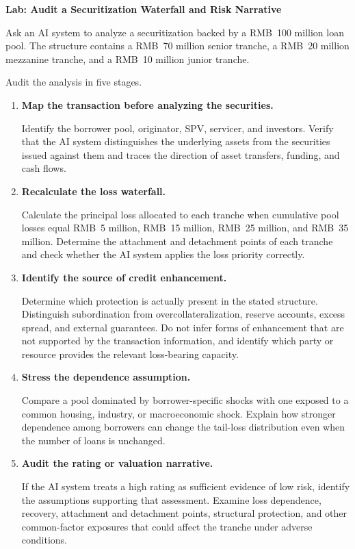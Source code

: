 

\textbf{Lab: Audit a Securitization Waterfall and Risk Narrative}

Ask an AI system to analyze a securitization backed by a RMB~100 million loan pool. The structure contains a RMB~70 million senior tranche, a RMB~20 million mezzanine tranche, and a RMB~10 million junior tranche.

Audit the analysis in five stages.

\begin{enumerate}

\item \textbf{Map the transaction before analyzing the securities.}

Identify the borrower pool, originator, SPV, servicer, and investors. Verify that the AI system distinguishes the underlying assets from the securities issued against them and traces the direction of asset transfers, funding, and cash flows.

\item \textbf{Recalculate the loss waterfall.}

Calculate the principal loss allocated to each tranche when cumulative pool losses equal RMB~5 million, RMB~15 million, RMB~25 million, and RMB~35 million. Determine the attachment and detachment points of each tranche and check whether the AI system applies the loss priority correctly.

\item \textbf{Identify the source of credit enhancement.}

Determine which protection is actually present in the stated structure. Distinguish subordination from overcollateralization, reserve accounts, excess spread, and external guarantees. Do not infer forms of enhancement that are not supported by the transaction information, and identify which party or resource provides the relevant loss-bearing capacity.

\item \textbf{Stress the dependence assumption.}

Compare a pool dominated by borrower-specific shocks with one exposed to a common housing, industry, or macroeconomic shock. Explain how stronger dependence among borrowers can change the tail-loss distribution even when the number of loans is unchanged.

\item \textbf{Audit the rating or valuation narrative.}

If the AI system treats a high rating as sufficient evidence of low risk, identify the assumptions supporting that assessment. Examine loss dependence, recovery, attachment and detachment points, structural protection, and other common-factor exposures that could affect the tranche under adverse conditions.

\end{enumerate}


